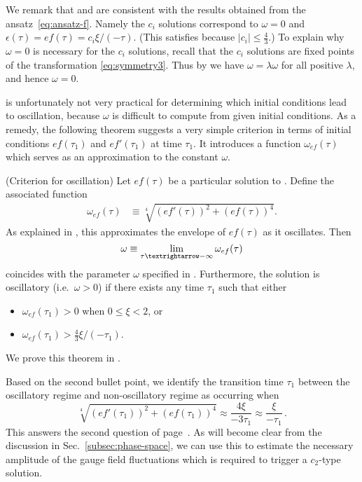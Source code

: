 We remark that  and  are consistent with the results obtained from the ansatz~\eqref{eq:ansatz-f}. Namely the $c_{i}$ solutions correspond to $\omega=0$ and $\epsilon(\tau)=ef(\tau)=c_{i}\xi/(-\tau)$. (This satisfies  because $\left|c_{i}\right|\leq\tfrac{4}{3}$.) To explain why $\omega=0$ is necessary for the $c_{i}$ solutions, recall that the $c_{i}$ solutions are fixed points of the transformation \eqref{eq:symmetry3}. Thus by  we have $\omega=\lambda\omega$ for all positive $\lambda$, and hence $\omega=0$. 

 is unfortunately not very practical for determining which initial conditions lead to oscillation, because $\omega$ is difficult to compute from given initial conditions. As a remedy, the following theorem suggests a very simple criterion in terms of initial conditions $ef(\tau_{1})$ and $ef'(\tau_{1})$ at time $\tau_{1}$. It introduces a function $\omega_{ef}(\tau)$ which serves as an approximation to the constant $\omega$. 
\begin{thm}
\label{thm:approx-w}(Criterion for oscillation) Let $ef(\tau)$ be a particular solution to . Define the associated function 
\begin{align}
\omega_{ef}(\tau) & \equiv\sqrt[4]{(ef'(\tau))^{2}+\left(ef(\tau)\right)^{4}}.\label{eq:omega_ef}
\end{align}
 As explained in , this approximates the envelope of $ef(\tau)$ as it oscillates. Then 
\[
\omega\equiv\lim_{\tau\textrightarrow-\infty}\omega_{ef}(\tau)
\]
 coincides with the parameter $\omega$ specified in . Furthermore, the solution is oscillatory (i.e.\ $\omega>0$) if there exists any time $\tau_{1}$ such that either 
\begin{itemize}
\item $\omega_{ef}(\tau_{1})>0$ when $0\leq\xi<2$, or 
\item $\omega_{ef}(\tau_{1})>\tfrac{4}{3}\xi/(-\tau_{1})$. 
\end{itemize}
\end{thm}

We prove this theorem in . 

Based on the second bullet point, we identify the transition time $\tau_{1}$ between the oscillatory regime and non-oscillatory regime as occurring when 
\begin{equation}
\sqrt[4]{(ef'(\tau_{1}))^{2}+\left(ef(\tau_{1})\right)^{4}}\approx\frac{4\xi}{-3\tau_{1}}\approx\frac{\xi}{-\tau_{1}}\,.\label{eq:BoundaryOscillatory}
\end{equation}
 This answers the second question of page~\pageref{enu:central-questions}. As will become clear from the discussion in Sec.~\ref{subsec:phase-space}, we can use this to estimate the necessary amplitude of the gauge field fluctuations which is required to trigger a $c_{2}$\nobreakdash-type solution.

